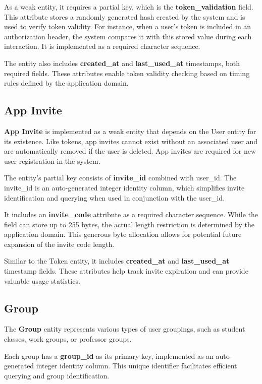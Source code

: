 \documentclass[a4paper,twoside,11pt]{article}
\begin{document}
As a weak entity, it requires a partial key, which is the \textbf{token\_validation} field. This attribute stores a randomly generated hash created by the system and is used to verify token validity. 
For instance, when a user's token is included in an authorization header, the system compares it with this stored value during each interaction. It is implemented as a required character sequence.

The entity also includes \textbf{created\_at} and \textbf{last\_used\_at} timestamps, both required fields. These attributes enable token validity checking based on timing rules defined by the application domain.

\subsection{App Invite}
\textbf{App Invite} is implemented as a weak entity that depends on the User entity for its existence. Like tokens, app invites cannot exist without an associated user and are automatically removed if the user is deleted. App invites are required for new user registration in the system.

The entity's partial key consists of \textbf{invite\_id} combined with user\_id. The invite\_id is an auto-generated integer identity column, which simplifies invite identification and querying when used in conjunction with the user\_id.

It includes an \textbf{invite\_code} attribute as a required character sequence. While the field can store up to 255 bytes, the actual length restriction is determined by the application domain. This generous byte allocation allows for potential future expansion of the invite code length.

Similar to the Token entity, it includes \textbf{created\_at} and \textbf{last\_used\_at} timestamp fields. These attributes help track invite expiration and can provide valuable usage statistics.

\subsection{Group}
The \textbf{Group} entity represents various types of user groupings, such as student classes, work groups, or professor groups.

Each group has a \textbf{group\_id} as its primary key, implemented as an auto-generated integer identity column. This unique identifier facilitates efficient querying and group identification.
\end{document}

